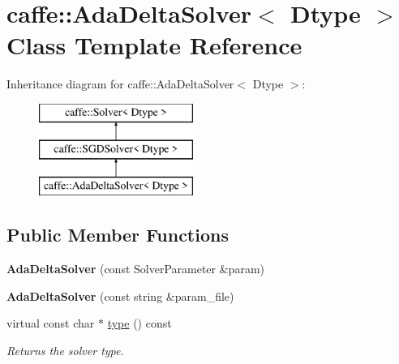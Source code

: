 \hypertarget{classcaffe_1_1AdaDeltaSolver}{}\section{caffe\+:\+:Ada\+Delta\+Solver$<$ Dtype $>$ Class Template Reference}
\label{classcaffe_1_1AdaDeltaSolver}
Inheritance diagram for caffe\+:\+:Ada\+Delta\+Solver$<$ Dtype $>$\+:\begin{figure}[H]
\begin{center}
\leavevmode
\includegraphics[height=3.000000cm]{classcaffe_1_1AdaDeltaSolver}
\end{center}
\end{figure}
\subsection*{Public Member Functions}
\begin{DoxyCompactItemize}
\item 
{\bfseries Ada\+Delta\+Solver} (const Solver\+Parameter \&param)\hypertarget{classcaffe_1_1AdaDeltaSolver_ad6f176b0beaa4a41d111f2c10a35b2f5}{}\label{classcaffe_1_1AdaDeltaSolver_ad6f176b0beaa4a41d111f2c10a35b2f5}

\item 
{\bfseries Ada\+Delta\+Solver} (const string \&param\+\_\+file)\hypertarget{classcaffe_1_1AdaDeltaSolver_adba552de0f9aa7e165cca5919d69cc09}{}\label{classcaffe_1_1AdaDeltaSolver_adba552de0f9aa7e165cca5919d69cc09}

\item 
virtual const char $\ast$ \hyperlink{classcaffe_1_1AdaDeltaSolver_a017ccdbd9a08a4b4b4db3013859a6cb0}{type} () const \hypertarget{classcaffe_1_1AdaDeltaSolver_a017ccdbd9a08a4b4b4db3013859a6cb0}{}\label{classcaffe_1_1AdaDeltaSolver_a017ccdbd9a08a4b4b4db3013859a6cb0}

\begin{DoxyCompactList}\small\item\em Returns the solver type. \end{DoxyCompactList}\end{DoxyCompactItemize}
